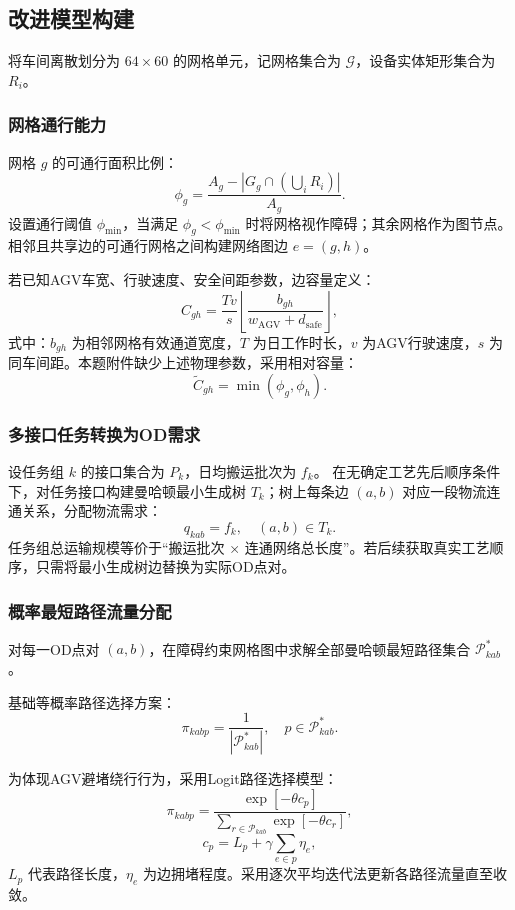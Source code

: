 \documentclass[12pt,a4paper]{article}
\begin{document}
	\subsection{改进模型构建}
	将车间离散划分为 $64\times 60$ 的网格单元，记网格集合为 $\mathcal{G}$，设备实体矩形集合为 $R_i$。
	
	\subsubsection{网格通行能力}
	网格 $g$ 的可通行面积比例：
	\[
	\phi_g=\frac{A_g-\left|G_g \cap\left(\bigcup_i R_i\right)\right|}{A_g}.
	\]
	设置通行阈值 $\phi_{\min}$，当满足 $\phi_g<\phi_{\min}$ 时将网格视作障碍；其余网格作为图节点。相邻且共享边的可通行网格之间构建网络图边 $e=(g,h)$。
	
	若已知AGV车宽、行驶速度、安全间距参数，边容量定义：
	\[
	C_{gh}=\frac{T v}{s}\left\lfloor\frac{b_{gh}}{w_{\text{AGV}}+d_{\text{safe}}}\right\rfloor,
	\]
	式中：$b_{gh}$ 为相邻网格有效通道宽度，$T$ 为日工作时长，$v$ 为AGV行驶速度，$s$ 为同车间距。本题附件缺少上述物理参数，采用相对容量：
	\[
	\widetilde{C}_{gh}=\min(\phi_g,\phi_h).
	\]
	
	\subsubsection{多接口任务转换为OD需求}
	设任务组 $k$ 的接口集合为 $P_k$，日均搬运批次为 $f_k$。
	在无确定工艺先后顺序条件下，对任务接口构建曼哈顿最小生成树 $T_k$；树上每条边 $(a,b)$ 对应一段物流连通关系，分配物流需求：
	\[
	q_{kab}=f_k,\quad (a,b)\in T_k.
	\]
	任务组总运输规模等价于“搬运批次 × 连通网络总长度”。若后续获取真实工艺顺序，只需将最小生成树边替换为实际OD点对。
	
	\subsubsection{概率最短路径流量分配}
	对每一OD点对 $(a,b)$，在障碍约束网格图中求解全部曼哈顿最短路径集合 $\mathcal{P}_{kab}^{*}$。
	
	基础等概率路径选择方案：
	\[
	\pi_{kabp}=\frac{1}{|\mathcal{P}_{kab}^{*}|},\quad p\in \mathcal{P}_{kab}^{*}.
	\]
	
	为体现AGV避堵绕行行为，采用Logit路径选择模型：
	\[
	\pi_{kabp}=\frac{\exp\left[-\theta c_p\right]}{\sum_{r\in \mathcal{P}_{kab}}\exp\left[-\theta c_r\right]},
	\]
	\[
	c_p=L_p+\gamma \sum_{e\in p}\eta_e,
	\]
	$L_p$ 代表路径长度，$\eta_e$ 为边拥堵程度。采用逐次平均迭代法更新各路径流量直至收敛。
	
\end{document}
